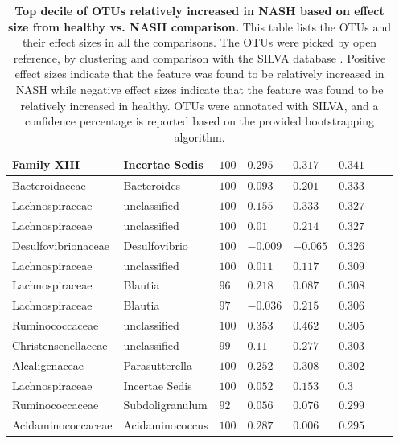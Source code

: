 \begin{table}[!ht]
\begin{tiny}
\begin{tabular}{|l|l|l|l|l|l|l|l|}
Family XIII & Incertae Sedis & $100$ & $0.295$ & $0.317$ & $0.341$ \\ \hline
Bacteroidaceae & Bacteroides & $100$ & $0.093$ & $0.201$ & $0.333$ \\ \hline
Lachnospiraceae & unclassified & $100$ & $0.155$ & $0.333$ & $0.327$ \\ \hline
Lachnospiraceae & unclassified & $100$ & $0.01$ & $0.214$ & $0.327$ \\ \hline
Desulfovibrionaceae & Desulfovibrio & $100$ & $-0.009$ & $-0.065$ & $0.326$ \\ \hline
Lachnospiraceae & unclassified & $100$ & $0.011$ & $0.117$ & $0.309$ \\ \hline
Lachnospiraceae & Blautia & $96$ & $0.218$ & $0.087$ & $0.308$ \\ \hline
Lachnospiraceae & Blautia & $97$ & $-0.036$ & $0.215$ & $0.306$ \\ \hline
Ruminococcaceae & unclassified & $100$ & $0.353$ & $0.462$ & $0.305$ \\ \hline
Christensenellaceae & unclassified & $99$ & $0.11$ & $0.277$ & $0.303$ \\ \hline
Alcaligenaceae & Parasutterella & $100$ & $0.252$ & $0.308$ & $0.302$ \\ \hline
Lachnospiraceae & Incertae Sedis & $100$ & $0.052$ & $0.153$ & $0.3$ \\ \hline
Ruminococcaceae & Subdoligranulum & $92$ & $0.056$ & $0.076$ & $0.299$ \\ \hline
Acidaminococcaceae & Acidaminococcus & $100$  & $0.287$ & $0.006$ & $0.295$ \\ \hline
\end{tabular}
\end{tiny}
\caption[Top decile of OTUs relatively increased in NASH based on effect size from healthy vs. NASH comparison.]{ \textbf{Top decile of OTUs relatively increased in NASH based on effect size from healthy vs. NASH comparison.} This table lists the OTUs and their effect sizes in all the comparisons. The OTUs were picked by open reference, by clustering and comparison with the SILVA database \cite{quast2013silva}. Positive effect sizes indicate that the feature was found to be relatively increased in NASH while negative effect sizes indicate that the feature was found to be relatively increased in healthy. OTUs were annotated with SILVA, and a confidence percentage is reported based on the provided bootstrapping algorithm.}
\label{nafld_top_otu_table}
\end{table}

